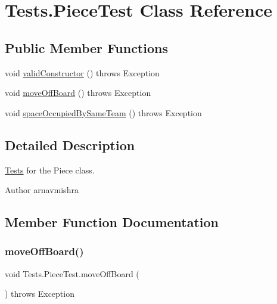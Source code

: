 \hypertarget{class_tests_1_1_piece_test}{}\section{Tests.\+Piece\+Test Class Reference}
\label{class_tests_1_1_piece_test}
\subsection*{Public Member Functions}
\begin{DoxyCompactItemize}
\item 
void \hyperlink{class_tests_1_1_piece_test_aa826a8207b7c0c34461cadbd06e86683}{valid\+Constructor} ()  throws Exception 
\item 
void \hyperlink{class_tests_1_1_piece_test_a13e9d2cc31b678368486b03c204408e7}{move\+Off\+Board} ()  throws Exception 
\item 
void \hyperlink{class_tests_1_1_piece_test_af08d686557ed19d88e13e3b3e387ab39}{space\+Occupied\+By\+Same\+Team} ()  throws Exception 
\end{DoxyCompactItemize}


\subsection{Detailed Description}
\hyperlink{namespace_tests}{Tests} for the Piece class. \begin{DoxyAuthor}{Author}
arnavmishra 
\end{DoxyAuthor}


\subsection{Member Function Documentation}
\hypertarget{class_tests_1_1_piece_test_a13e9d2cc31b678368486b03c204408e7}{}\label{class_tests_1_1_piece_test_a13e9d2cc31b678368486b03c204408e7} 
\subsubsection{\texorpdfstring{move\+Off\+Board()}{moveOffBoard()}}
{\footnotesize\ttfamily void Tests.\+Piece\+Test.\+move\+Off\+Board (\begin{DoxyParamCaption}{ }\end{DoxyParamCaption}) throws Exception}

